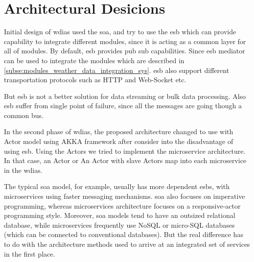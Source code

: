 \section{Architectural Desicions}
\label{se:architectural_decisions}

Initial design of \acrshort{wdias} used the \acrfull{soa}, and try to use the \acrfull{esb} which can provide capability to integrate different modules, since it is acting as a common layer for all of modules. By default, \acrshort{esb} provides pub sub capabilities.
Since \acrshort{esb} mediator can be used to integrate the modules which are described in \ref{subse:modules_weather_data_integration_sys}. \acrshort{esb} also support different transportation protocols such as HTTP and Web-Socket etc.

But \acrshort{esb} is not a better solution for data streaming or bulk data processing. Also \acrshort{esb} suffer from single point of failure, since all the messages are going though a common bus.

In the second phase of \acrshort{wdias}, the proposed architecture changed to use with Actor model using AKKA framework \cite{HewittWhyModel} after consider into the disadvantage of using \acrshort{esb}. Using the Actors we tried to implement the microservice architecture. In that case, an Actor or An Actor with slave Actors map into each microservice in the \acrshort{wdias}.

The typical \acrshort{soa} model, for example, usually has more dependent \acrshort{esb}s, with microservices using faster messaging mechanisms. \acrshort{soa} also focuses on imperative programming, whereas microservices architecture focuses on a responsive-actor programming style. Moreover, \acrshort{soa} models tend to have an outsized relational database, while microservices frequently use NoSQL or micro-SQL databases (which can be connected to conventional databases). But the real difference has to do with the architecture methods used to arrive at an integrated set of services in the first place.

